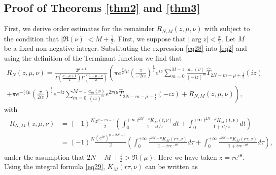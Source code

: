 \documentclass[a4paper,twoside,10pt]{amsart}
\numberwithin{equation}{section}
\begin{document}
\subsection{Proof of Theorems \ref{thm2} and \ref{thm3}} First, we derive order estimates for the remainder $R_{N,M} \left( {z,\mu ,\nu } \right)$ with subject to the condition that $\left| {\Re \left( \nu  \right)} \right| < M + \frac{1}{2}$. First, we suppose that $\left|\arg z\right|< \frac{\pi}{2}$. Let $M$ be a fixed non-negative integer. Substituting the expression \eqref{eq28} into \eqref{eq2} and using the definition of the Terminant function we find that
\begin{multline*}
R_N \left( {z,\mu ,\nu } \right) = \frac{{2^{\mu  + 1} }}{{\Gamma \left( {\frac{{\nu  - \mu  + 1}}{2}} \right)\Gamma \left( {\frac{{1 - \mu  - \nu }}{2}} \right)}}\left( {\pi e^{\frac{\pi }{2}i\mu } \left( {\frac{\pi}{-2iz}} \right)^{\frac{1}{2}} e^{iz} \sum\limits_{m = 0}^{M - 1} {\frac{{a_m \left( \nu  \right)}}{{\left( {-iz} \right)^m }} \widehat T_{2N - m - \mu  + \frac{1}{2}} \left( {iz} \right)} }\right. \\ \left.{+ \pi e^{ - \frac{\pi }{2}i\mu } \left( {\frac{\pi }{{2iz }}} \right)^{\frac{1}{2}} e^{ - iz} \sum\limits_{m = 0}^{M - 1} {\frac{{a_m \left( \nu  \right)}}{{\left( {iz } \right)^m }}e^{2\pi i\mu } \widehat T_{2N - m - \mu  + \frac{1}{2}} \left( { - iz} \right)}  + R_{N,M} \left( {z,\mu ,\nu } \right)} \right),
\end{multline*}
with
\begin{gather}\label{eq9}
\begin{split}
R_{N,M} \left( {z,\mu ,\nu } \right) & = \left( { - 1} \right)^N \frac{{z^{\mu  - 2N - 1} }}{2}\left( {\int_0^{ + \infty } {\frac{{t^{2N - \mu } K_M \left( {t,\nu } \right)}}{{1 - it/z}}dt}  + \int_0^{ + \infty } {\frac{{t^{2N - \mu } K_M \left( {t,\nu } \right)}}{{1 + it/z}}dt} } \right)
\\ & = \left( { - 1} \right)^N \frac{{\left( {e^{i\theta } } \right)^{\mu  - 2N - 1} }}{2}\left( {\int_0^{ + \infty } {\frac{{\tau ^{2N - \mu } K_M \left( {r\tau ,\nu } \right)}}{{1 - i\tau e^{ - i\theta } }}d\tau }  + \int_0^{ + \infty } {\frac{{\tau ^{2N - \mu } K_M \left( {r\tau ,\nu } \right)}}{{1 + i\tau e^{ - i\theta } }}d\tau } } \right),
\end{split}
\end{gather}
under the assumption that $2N - M + \frac{1}{2} > \Re \left( \mu  \right)$. Here we have taken $z = re^{i\theta }$. Using the integral formula \eqref{eq29}, $K_M \left( {r\tau ,\nu } \right)$ can be written as
\end{document}
